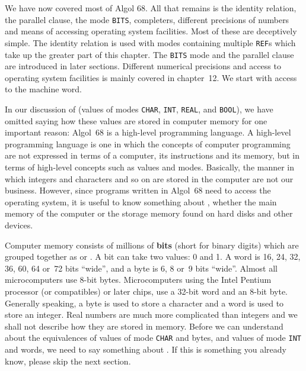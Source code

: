 %
%
%
%
%
We have now covered most of Algol 68.  All that remains is the
identity relation, the parallel clause, the mode \verb|BITS|,
completers, different precisions of numbers and means of accessing
operating system facilities. Most of these are deceptively simple.
The identity relation is used with modes containing multiple
\verb|REF|s which take up the greater part of this chapter.  The
\verb|BITS| mode and the parallel clause are introduced in later
sections. Different numerical precisions and access to operating
system facilities is mainly covered in chapter~12. We start with
access to the machine word.
\newpage

In our discussion of  (values of
modes \verb|CHAR|, \verb|INT|, \verb|REAL|, and \verb|BOOL|), we have
omitted saying how these values are stored in computer memory for one
important reason: Algol~68 is a high-level programming language. A
high-level programming language is one in which the concepts of
computer programming are not expressed in terms of a computer, its
instructions and its memory, but in terms of high-level concepts such
as values and modes. Basically, the manner in which integers and
characters and so on are stored in the computer are not our business.
However, since programs written in Algol~68 need to access the
operating system, it is useful to know something about ,
whether the main memory of the computer or the storage memory found
on hard disks and other devices.

Computer memory consists of millions of \textbf{bits} (short for binary
digits) which are grouped together as  or .
A bit can take two values: 0 and 1.  A word is 16, 24, 32, 36, 60, 64
or~72 bits ``wide'', and a byte is 6, 8 or~9 bits ``wide''. Almost
all microcomputers use 8-bit bytes.  Microcomputers using the Intel
Pentium processor (or compatibles) or later chips, use a 32-bit word
and an 8-bit byte.  Generally speaking, a byte is used to store a
character and a word is used to store an integer.  Real numbers are
much more complicated than integers and we shall not describe how
they are stored in memory.  Before we can understand about the
equivalences of values of mode \verb|CHAR| and bytes, and values of
mode \verb|INT| and words, we need to say something about
.  If this is
something you already know, please skip the next section.

